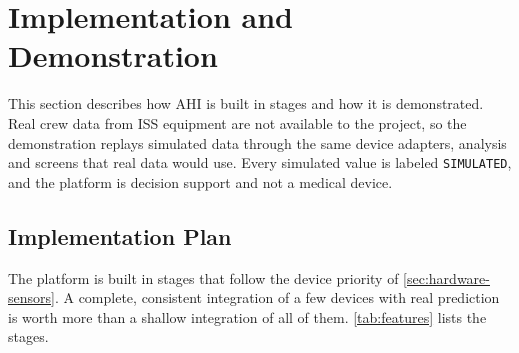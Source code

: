 \section{Implementation and Demonstration}
\label{sec:implementation-demo}

This section describes how AHI is built in stages and how it is demonstrated. Real crew data from ISS equipment are not available to the project, so the demonstration replays simulated data through the same device adapters, analysis and screens that real data would use. Every simulated value is labeled \texttt{SIMULATED}, and the platform is decision support and not a medical device.

\subsection{Implementation Plan}
\label{subsec:features}

The platform is built in stages that follow the device priority of \ref{sec:hardware-sensors}. A complete, consistent integration of a few devices with real prediction is worth more than a shallow integration of all of them. \ref{tab:features} lists the stages.

